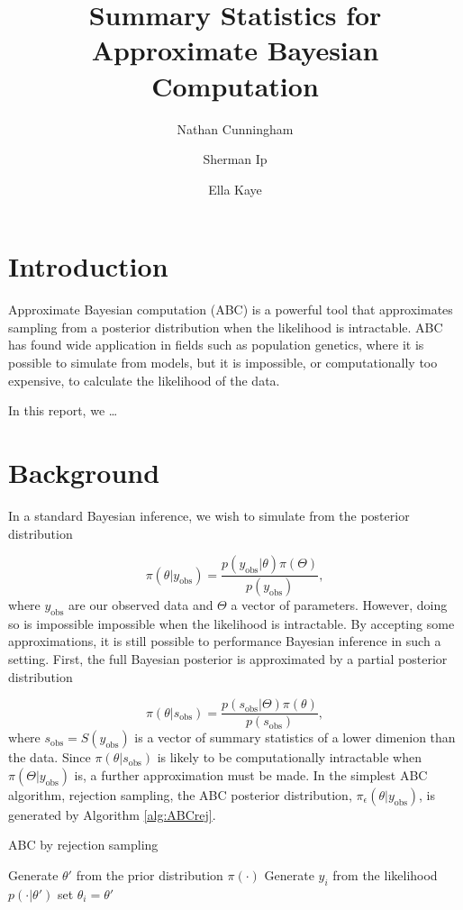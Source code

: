 \documentclass[a4paper,10pt]{article}
\title{Summary Statistics for Approximate Bayesian Computation}
\author{Nathan Cunningham \and Sherman Ip \and Ella Kaye}
\begin{document}
\maketitle

\section{Introduction}
Approximate Bayesian computation (ABC) is a powerful tool that approximates sampling from a posterior distribution when the likelihood is intractable. ABC has found wide application in fields such as population genetics, where it is possible to simulate from models, but it is impossible, or computationally too expensive, to calculate the likelihood of the data.

In this report, we \ldots

\section{Background}
In a standard Bayesian inference, we wish to simulate from the posterior distribution

\[
\pi(\theta | y_\textrm{obs}) = \frac{p(y_\textrm{obs} | \theta) \pi(\Theta)}{p(y_\textrm{obs})},
\]
where $y_\textrm{obs}$ are our observed data and $\Theta$ a vector of parameters. However, doing so is impossible impossible when the likelihood is intractable. By accepting some approximations, it is still possible to performance Bayesian inference in such a setting. First, the full Bayesian posterior is approximated by a partial posterior distribution

\[
\pi(\theta | s_\textrm{obs}) = \frac{p(s_\textrm{obs} | \Theta) \pi(\theta)}{p(s_\textrm{obs})},
\]
where $s_\textrm{obs} = S(y_\textrm{obs})$ is a vector of summary statistics of a lower dimenion than the data. Since $\pi(\theta | s_\textrm{obs})$ is likely to be computationally intractable when $\pi(\Theta | y_\textrm{obs})$ is, a further approximation must be made. In the simplest ABC algorithm, rejection sampling, the ABC posterior distribution, $\pi_{\epsilon}(\theta | y_\textrm{obs})$, is generated by Algorithm \ref{alg:ABCrej}.

\begin{algorithm}
\caption{ABC by rejection sampling} \label{alg:ABCrej}
\begin{algorithmic}
\REPEAT
\STATE Generate $\theta'$ from the prior distribution $\pi(\cdot)$
\STATE Generate $y_i$ from the likelihood $p(\cdot | \theta')$
\STATE set $\theta_i = \theta'$
\ENDFOR
\end{algorithmic}
\end{algorithm}
\end{document}
